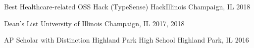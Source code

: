 


\begin{cvhonors}
	
\cvhonor
	{Best Healthcare-related OSS Hack (TypeSense)} %
	{HackIllinois} %
	{Champaign, IL} %
	{2018} %

  \cvhonor
    {Dean's List} %
    {University of Illinois} %
    {Champaign, IL} %
    {2017, 2018} %

  \cvhonor
    {AP Scholar with Distinction} %
    {Highland Park High School} %
    {Highland Park, IL} %
    {2016} %
    
\end{cvhonors}
